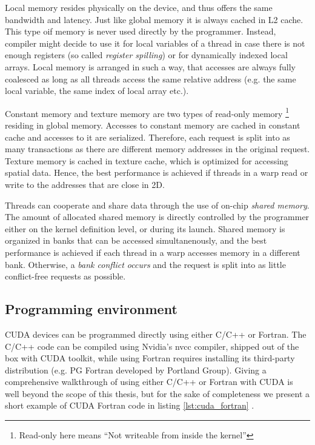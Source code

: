 Local memory resides physically on the device, and thus offers the same bandwidth and latency. Just like global memory it is always cached in L2 cache. This type oif memory is never used directly by the programmer. Instead, compiler might decide to use it for local variables of a thread in case there is not enough registers (so called \emph{register spilling}) or for dynamically indexed local arrays. Local memory is arranged in such a way, that accesses are always fully coalesced as long as all threads access the same relative address (e.g. the same local variable, the same index of local array etc.).

Constant memory and texture memory are two types of read-only memory \footnote{Read-only here means ``Not writeable from inside the kernel''} residing in global memory. Accesses to constant memory are cached in constant cache and accesses to it are serialized. Therefore, each request is split into as many  transactions as there are different memory addresses in the original request. Texture memory is cached in texture cache, which is optimized for accessing spatial data. Hence, the best performance is achieved if threads in a warp read or write to the addresses that are close in 2D.

Threads can cooperate and share data through the use of on-chip \emph{shared  memory}. The amount of allocated shared memory is directly controlled by the programmer either on the kernel definition level, or during its launch. Shared memory is organized in banks that can be accessed simultanenously, and the best performance is achieved if each thread in a warp accesses memory in a different bank. Otherwise, a \emph{bank conflict occurs} and the request is split into as little conflict-free requests as possible.


\subsection{Programming environment}
CUDA devices can be programmed directly using either C/C++ or Fortran. The C/C++ code can be compiled using Nvidia's nvcc compiler, shipped out of the box with CUDA toolkit, while using Fortran requires installing its third-party distribution (e.g. PG Fortran developed by Portland Group). Giving a comprehensive walkthrough of using either C/C++ or Fortran with CUDA is well beyond the scope of this thesis, but for the sake of completeness we present a short example of CUDA Fortran code in listing \ref{lst:cuda_fortran} .

